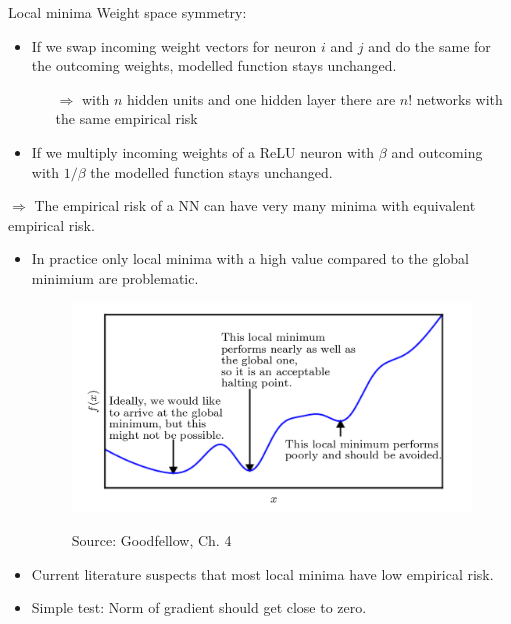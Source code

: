 \begin{vbframe} {Local minima}
   Weight space symmetry:
   \begin{itemize}
       \item If we swap incoming weight vectors for neuron $i$ and $j$
       and do the same for the outcoming weights,
       modelled function stays unchanged.
        \begin{itemize}
           \item[$\Rightarrow$] with $n$ hidden units and one hidden layer
           there are $n!$ networks with the same empirical risk
        \end{itemize}
       \item If we multiply incoming weights of a ReLU neuron with $\beta$
       and outcoming with $1/\beta$ the modelled function stays unchanged.
      \end{itemize}
  $\Rightarrow$ The empirical risk of a NN can have very many
          minima with equivalent empirical risk.

\framebreak 

    \begin{itemize}
     \item In practice only local minima with a high value compared to the global minimium are problematic.
    \begin{figure}
     \begin{center}
     \includegraphics[width=.6\textwidth]{plots/minima.png}
     \end{center}
    \tiny{Source: Goodfellow, Ch. 4}
    \end{figure}
     \item Current literature suspects that most local minima have low empirical risk.
     \item Simple test: Norm of gradient should get close to zero.
\end{itemize}
\end{vbframe}

